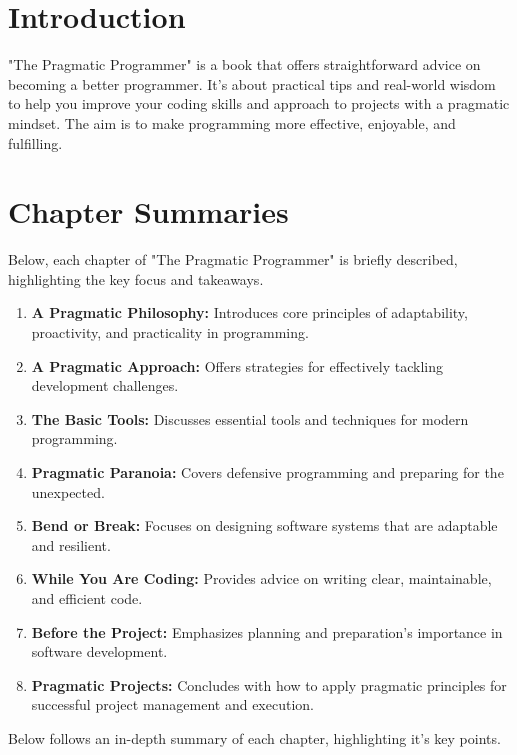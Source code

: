 \section{Introduction}
"The Pragmatic Programmer" is a book that offers straightforward advice on becoming a better programmer. It's about practical tips and real-world wisdom to help you improve your coding skills and approach to projects with a pragmatic mindset. The aim is to make programming more effective, enjoyable, and fulfilling.

\section{Chapter Summaries}
Below, each chapter of "The Pragmatic Programmer" is briefly described, highlighting the key focus and takeaways.

\begin{enumerate}
    \item \textbf{A Pragmatic Philosophy:} Introduces core principles of adaptability, proactivity, and practicality in programming.
    \item \textbf{A Pragmatic Approach:} Offers strategies for effectively tackling development challenges.
    \item \textbf{The Basic Tools:} Discusses essential tools and techniques for modern programming.
    \item \textbf{Pragmatic Paranoia:} Covers defensive programming and preparing for the unexpected.
    \item \textbf{Bend or Break:} Focuses on designing software systems that are adaptable and resilient.
    \item \textbf{While You Are Coding:} Provides advice on writing clear, maintainable, and efficient code.
    \item \textbf{Before the Project:} Emphasizes planning and preparation's importance in software development.
    \item \textbf{Pragmatic Projects:} Concludes with how to apply pragmatic principles for successful project management and execution.
\end{enumerate}

Below follows an in-depth summary of each chapter, highlighting it's key points.